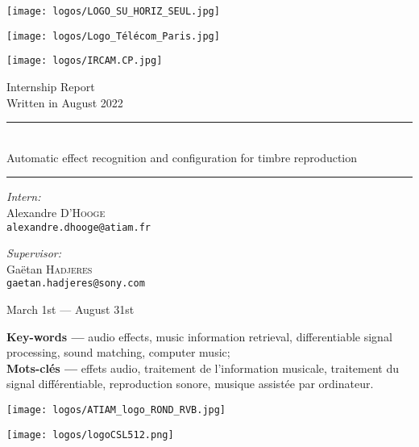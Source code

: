 \begin{titlepage}
\centering
\begin{minipage}{.25\linewidth}
\texttt{[image: logos/LOGO\_SU\_HORIZ\_SEUL.jpg]}
\end{minipage}
\hfill
\begin{minipage}{.25\linewidth}
\centering
\texttt{[image: logos/Logo\_Télécom\_Paris.jpg]}
\end{minipage}
\hfill
\begin{minipage}{.25\linewidth}
\texttt{[image: logos/IRCAM.CP.jpg]}
\end{minipage}

\vfill


{\large Internship Report \\ Written in August 2022 \vspace{1\baselineskip}}

\begin{minipage}{\linewidth}
\huge
\bfseries
\centering
\rule{\linewidth}{1.5pt}\\
Automatic effect recognition and configuration for timbre reproduction\\[-3mm]
\rule{\linewidth}{1.5pt}
\end{minipage}

\vfill

\begin{minipage}{.45\linewidth}
\textit{Intern:}\\
Alexandre \textsc{D'Hooge}\\
\texttt{alexandre.dhooge@atiam.fr}
\end{minipage}
\hfill
\begin{minipage}{.45\linewidth}
\flushright
\textit{Supervisor:}\\
Gaëtan \textsc{Hadjeres}\\
\texttt{gaetan.hadjeres@sony.com}
\end{minipage}

\vfill

March 1st --- August 31st
\vspace{1\baselineskip}\\
\begin{flushleft}
\textbf{Key-words ---} audio effects, music information retrieval, differentiable signal processing, sound matching, computer music;
\vspace{.5\baselineskip}\\
\textbf{Mots-clés \hspace{1ex}---} effets audio, traitement de l'information musicale, traitement du signal différentiable, reproduction sonore, musique assistée par ordinateur.
\end{flushleft}
\vfill

\begin{minipage}{.25\linewidth}
\texttt{[image: logos/ATIAM\_logo\_ROND\_RVB.jpg]}
\end{minipage}
\hspace{5cm}
\begin{minipage}{.25\linewidth}
\texttt{[image: logos/logoCSL512.png]}
\end{minipage}

\end{titlepage}
